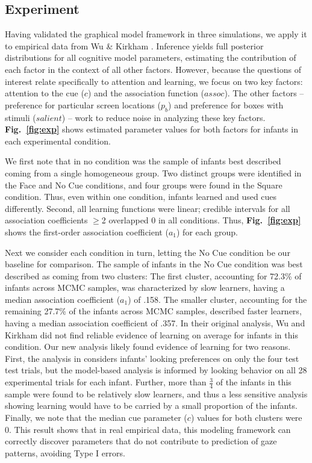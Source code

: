 \documentclass[12pt]{article}
\begin{document}
\subsection*{Experiment}

	Having validated the graphical model framework in three simulations, we apply it to empirical data from Wu \& Kirkham \cite{Wu2010a}. Inference yields full posterior distributions for all cognitive model parameters, estimating the contribution of each factor in the context of all other factors. However, because the questions of interest relate specifically to attention and learning, we focus on two key factors: attention to the cue ($c$) and the association function ($assoc$). The other factors -- preference for particular screen locations ($p_{b}$) and preference for boxes with stimuli ($salient$) -- work to reduce noise in analyzing these key factors. \textbf{Fig.~\ref{fig:exp}} shows estimated parameter values for both factors for infants in each experimental condition.

	We first note that in no condition was the sample of infants best described coming from a single homogeneous group. Two distinct groups were identified in the Face and No Cue conditions, and four groups were found in the Square condition. Thus, even within one condition, infants learned and used cues differently. Second, all learning functions were linear; credible intervals for all association coefficients $\geq$2 overlapped 0 in all conditions. Thus, \textbf{Fig.~\ref{fig:exp}} shows the first-order association coefficient ($a_{1}$) for each group. 

	Next we consider each condition in turn, letting the No Cue condition be our baseline for comparison. The sample of infants in the No Cue condition was best described as coming from two clusters: The first cluster, accounting for 72.3\% of infants across MCMC samples, was characterized by slow learners, having a median association coefficient ($a_{1}$) of .158. The smaller cluster, accounting for the remaining 27.7\% of the infants across MCMC samples, described faster learners, having a median association coefficient of .357. In their original analysis, Wu and Kirkham \cite{Wu2010a} did not find reliable evidence of learning on average for infants in this condition. Our new analysis likely found evidence of learning for two reasons. First, the analysis in \cite{Wu2010a} considers infants' looking preferences on only the four test test trials, but the model-based analysis is informed by looking behavior on all 28 experimental trials for each infant. Further, more than $\frac{3}{4}$ of the infants in this sample were found to be relatively slow learners, and thus a less sensitive analysis showing learning would have to be carried by a small proportion of the infants. Finally, we note that the median cue parameter ($c$) values for both clusters were 0. This result shows that in real empirical data, this modeling framework can correctly discover parameters that do not contribute to prediction of gaze patterns, avoiding Type I errors.
\end{document}
